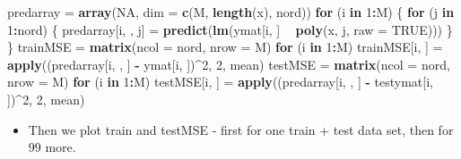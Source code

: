 \documentclass[]{article}
\newenvironment{Shaded}{\begin{snugshade}}{\end{snugshade}}
\newcommand{\ControlFlowTok}[1]{\textcolor[rgb]{0.13,0.29,0.53}{\textbf{#1}}}
\newcommand{\DataTypeTok}[1]{\textcolor[rgb]{0.13,0.29,0.53}{#1}}
\newcommand{\DecValTok}[1]{\textcolor[rgb]{0.00,0.00,0.81}{#1}}
\newcommand{\KeywordTok}[1]{\textcolor[rgb]{0.13,0.29,0.53}{\textbf{#1}}}
\newcommand{\NormalTok}[1]{#1}
\newcommand{\OperatorTok}[1]{\textcolor[rgb]{0.81,0.36,0.00}{\textbf{#1}}}
\newcommand{\OtherTok}[1]{\textcolor[rgb]{0.56,0.35,0.01}{#1}}
\newcommand{\StringTok}[1]{\textcolor[rgb]{0.31,0.60,0.02}{#1}}
\providecommand{\tightlist}{%
  \setlength{\itemsep}{0pt}\setlength{\parskip}{0pt}}
\begin{document}
\begin{Shaded}
\begin{Highlighting}[]
\NormalTok{predarray =}\StringTok{ }\KeywordTok{array}\NormalTok{(}\OtherTok{NA}\NormalTok{, }\DataTypeTok{dim =} \KeywordTok{c}\NormalTok{(M, }\KeywordTok{length}\NormalTok{(x), nord))}
\ControlFlowTok{for}\NormalTok{ (i }\ControlFlowTok{in} \DecValTok{1}\OperatorTok{:}\NormalTok{M) \{}
    \ControlFlowTok{for}\NormalTok{ (j }\ControlFlowTok{in} \DecValTok{1}\OperatorTok{:}\NormalTok{nord) \{}
\NormalTok{        predarray[i, , j] =}\StringTok{ }\KeywordTok{predict}\NormalTok{(}\KeywordTok{lm}\NormalTok{(ymat[i, ] }\OperatorTok{~}\StringTok{ }\KeywordTok{poly}\NormalTok{(x, j, }\DataTypeTok{raw =} \OtherTok{TRUE}\NormalTok{)))}
\NormalTok{    \}}
\NormalTok{\}}
\NormalTok{trainMSE =}\StringTok{ }\KeywordTok{matrix}\NormalTok{(}\DataTypeTok{ncol =}\NormalTok{ nord, }\DataTypeTok{nrow =}\NormalTok{ M)}
\ControlFlowTok{for}\NormalTok{ (i }\ControlFlowTok{in} \DecValTok{1}\OperatorTok{:}\NormalTok{M) trainMSE[i, ] =}\StringTok{ }\KeywordTok{apply}\NormalTok{((predarray[i, , ] }\OperatorTok{-}\StringTok{ }\NormalTok{ymat[i, ])}\OperatorTok{^}\DecValTok{2}\NormalTok{, }
    \DecValTok{2}\NormalTok{, mean)}
\NormalTok{testMSE =}\StringTok{ }\KeywordTok{matrix}\NormalTok{(}\DataTypeTok{ncol =}\NormalTok{ nord, }\DataTypeTok{nrow =}\NormalTok{ M)}
\ControlFlowTok{for}\NormalTok{ (i }\ControlFlowTok{in} \DecValTok{1}\OperatorTok{:}\NormalTok{M) testMSE[i, ] =}\StringTok{ }\KeywordTok{apply}\NormalTok{((predarray[i, , ] }\OperatorTok{-}\StringTok{ }\NormalTok{testymat[i, ])}\OperatorTok{^}\DecValTok{2}\NormalTok{, }
    \DecValTok{2}\NormalTok{, mean)}
\end{Highlighting}
\end{Shaded}

\begin{itemize}
\tightlist
\item
  Then we plot train and testMSE - first for one train + test data set,
  then for 99 more.
\end{itemize}
\end{document}
